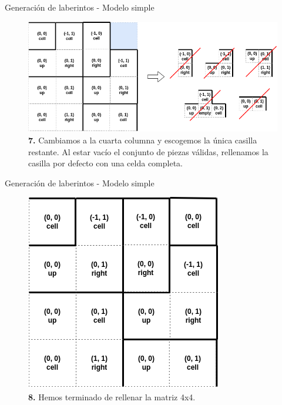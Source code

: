 \documentclass{beamer}
\begin{document}
    \begin{frame}{Generación de laberintos - Modelo simple \scriptsize{\hfill \secname}}
        \begin{figure}[H]
        \centering
            \includegraphics[scale=0.375]{img/paso7.png}
            \caption{\textbf{7.} Cambiamos a la cuarta columna y escogemos la única casilla restante. Al estar vacío el conjunto de piezas válidas, rellenamos la casilla por defecto con una celda completa.}
        \end{figure}
    \end{frame}
    
    \begin{frame}{Generación de laberintos - Modelo simple \scriptsize{\hfill \secname}}
        \begin{figure}[H]
        \centering
            \includegraphics[scale=0.375]{img/paso8.png}
            \caption{\textbf{8.} Hemos terminado de rellenar la matriz 4x4.}
        \end{figure}
    \end{frame}
    
\end{document}
